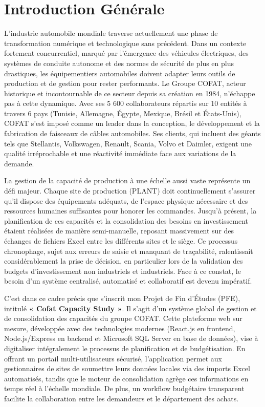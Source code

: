 \chapter*{Introduction Générale}

L'industrie automobile mondiale traverse actuellement une phase de transformation numérique et technologique sans précédent. Dans un contexte fortement concurrentiel, marqué par l'émergence des véhicules électriques, des systèmes de conduite autonome et des normes de sécurité de plus en plus drastiques, les équipementiers automobiles doivent adapter leurs outils de production et de gestion pour rester performants. Le Groupe COFAT, acteur historique et incontournable de ce secteur depuis sa création en 1984, n'échappe pas à cette dynamique. Avec ses 5 600 collaborateurs répartis sur 10 entités à travers 6 pays (Tunisie, Allemagne, Égypte, Mexique, Brésil et États-Unis), COFAT s'est imposé comme un leader dans la conception, le développement et la fabrication de faisceaux de câbles automobiles. Ses clients, qui incluent des géants tels que Stellantis, Volkswagen, Renault, Scania, Volvo et Daimler, exigent une qualité irréprochable et une réactivité immédiate face aux variations de la demande.

La gestion de la capacité de production à une échelle aussi vaste représente un défi majeur. Chaque site de production (PLANT) doit continuellement s'assurer qu'il dispose des équipements adéquats, de l'espace physique nécessaire et des ressources humaines suffisantes pour honorer les commandes. Jusqu'à présent, la planification de ces capacités et la consolidation des besoins en investissement étaient réalisées de manière semi-manuelle, reposant massivement sur des échanges de fichiers Excel entre les différents sites et le siège. Ce processus chronophage, sujet aux erreurs de saisie et manquant de traçabilité, ralentissait considérablement la prise de décision, en particulier lors de la validation des budgets d'investissement non industriels et industriels. Face à ce constat, le besoin d'un système centralisé, automatisé et collaboratif est devenu impératif.

C'est dans ce cadre précis que s'inscrit mon Projet de Fin d'Études (PFE), intitulé \textbf{« Cofat Capacity Study »}. Il s'agit d'un système global de gestion et de consolidation des capacités du groupe COFAT. Cette plateforme web sur mesure, développée avec des technologies modernes (React.js en frontend, Node.js/Express en backend et Microsoft SQL Server en base de données), vise à digitaliser intégralement le processus de planification et de budgétisation. En offrant un portail multi-utilisateurs sécurisé, l'application permet aux gestionnaires de sites de soumettre leurs données locales via des imports Excel automatisés, tandis que le moteur de consolidation agrège ces informations en temps réel à l'échelle mondiale. De plus, un workflow budgétaire transparent facilite la collaboration entre les demandeurs et le département des achats.

